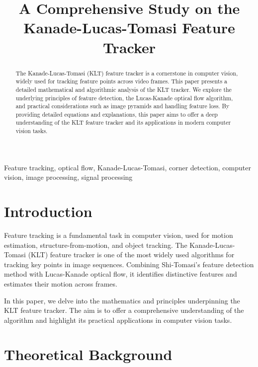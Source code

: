 \documentclass[10pt, conference, letterpaper]{IEEEtran}
\begin{document}
\title{A Comprehensive Study on the Kanade-Lucas-Tomasi Feature Tracker}

\author{
}

\maketitle

\begin{abstract}
The Kanade-Lucas-Tomasi (KLT) feature tracker is a cornerstone in computer vision, widely used for tracking feature points across video frames. This paper presents a detailed mathematical and algorithmic analysis of the KLT tracker. We explore the underlying principles of feature detection, the Lucas-Kanade optical flow algorithm, and practical considerations such as image pyramids and handling feature loss. By providing detailed equations and explanations, this paper aims to offer a deep understanding of the KLT feature tracker and its applications in modern computer vision tasks.
\end{abstract}

\begin{IEEEkeywords}
Feature tracking, optical flow, Kanade-Lucas-Tomasi, corner detection, computer vision, image processing, signal processing
\end{IEEEkeywords}

\section{Introduction}
Feature tracking is a fundamental task in computer vision, used for motion estimation, structure-from-motion, and object tracking. The Kanade-Lucas-Tomasi (KLT) feature tracker is one of the most widely used algorithms for tracking key points in image sequences. Combining Shi-Tomasi's feature detection method with Lucas-Kanade optical flow, it identifies distinctive features and estimates their motion across frames.

In this paper, we delve into the mathematics and principles underpinning the KLT feature tracker. The aim is to offer a comprehensive understanding of the algorithm and highlight its practical applications in computer vision tasks.

\section{Theoretical Background}
\end{document}
